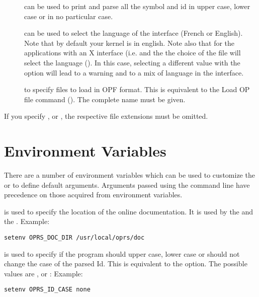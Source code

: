 \begin{description}
\item[] can be used to print and parse all the symbol
and id in upper case, lower case or in no particular case.

\item[] can be used to select the language of the interface
(French or English). Note that by default your kernel is in english. Note also
that for the applications with an X interface (i.e. \XPK{} and the \OPE{} the
choice of the  file will select the language
(). In this case, selecting a
different value with the option will lead to a warning and to a mix of language
in the interface.

\item[] to specify files to load in OPF format. This is
equivalent to the Load OP file command (). The
complete name must be given.

\end{description}

If you specify ,  or , the respective file
extensions must be omitted.


\section{\OPE{} Environment Variables}

There are a number of environment variables which can be used to customize the
\OPE{} or to define default arguments. Arguments passed using the command line
have precedence on those acquired from environment variables.

\begin{description}

\item[\code{OPRS\_DOC\_DIR}] is used  to specify the location of the online \COPRSDE{}
documentation. It is used by the \XPK{} and the \OPE{}.
Example:
\begin{verbatim}
setenv OPRS_DOC_DIR /usr/local/oprs/doc
\end{verbatim}

\item[\code{OPRS\_ID\_CASE}] is used to specify if the program should upper case,
lower case or should not change the case of the parsed Id. This is equivalent
to the  option. The possible values
are ,  or :\*
Example:
\begin{verbatim}
setenv OPRS_ID_CASE none
\end{verbatim}

\end{description}


